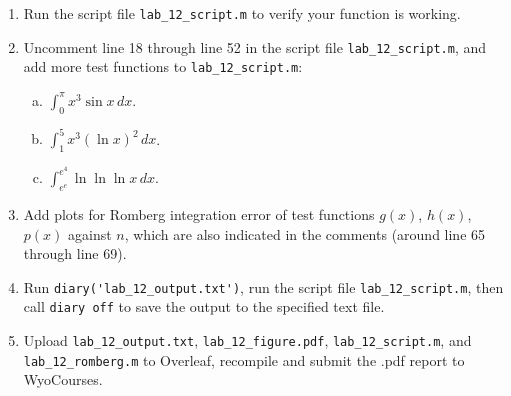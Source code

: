\begin{enumerate}[1.]
    \item Run the script file \verb`lab_12_script.m` to verify your function is working.
    \item Uncomment line 18 through line 52 in the script file \verb`lab_12_script.m`, and add more test functions to \verb`lab_12_script.m`:
        \begin{enumerate}[(a)]
            \item $\displaystyle \int_{0}^{\pi} x^3 \sin{x} \, dx$.
            \item $\displaystyle \int_{1}^{5} x^3 (\ln{x})^2 \, dx$.
            \item $\displaystyle \int_{e^e}^{e^4} \ln{\ln{\ln{x}}} \, dx$.
        \end{enumerate}
    \item Add plots for Romberg integration error of test functions $g(x)$, $h(x)$,  $p(x)$ against $n$, which are also indicated in the comments (around line 65 through line 69).
    \item Run \verb`diary('lab_12_output.txt')`, run the script file \verb`lab_12_script.m`, then call \verb`diary off` to save the output to the specified text file.
    \item Upload \verb`lab_12_output.txt`, \verb`lab_12_figure.pdf`, \verb`lab_12_script.m`, and \verb`lab_12_romberg.m` to Overleaf, recompile and submit the .pdf report to WyoCourses.
\end{enumerate}
